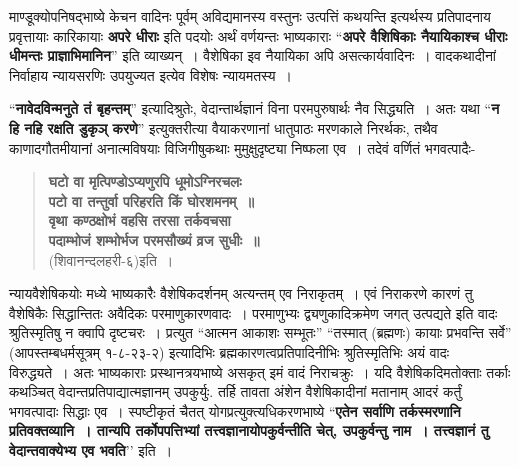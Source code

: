 {माण्डूक्योपनिषद्भाष्ये केचन वादिनः पूर्वम् अविद्यमानस्य वस्तुनः उत्पत्तिं कथयन्ति इत्यर्थस्य प्रतिपादनाय प्रवृत्तायाः कारिकायाः \textbf{अपरे धीराः} इति पदयोः अर्थं वर्णयन्तः भाष्यकाराः “\textbf{अपरे वैशिषिकाः नैयायिकाश्च धीराः धीमन्तः प्राज्ञाभिमानिन}” इति व्याख्यन्~। वैशेषिका इव नैयायिका अपि असत्कार्यवादिनः~। वादकथादीनां निर्वाहाय न्यायसरणिः उपयुज्यत इत्येव विशेषः न्यायमतस्य~। 

“\textbf{नावेदविन्मनुते तं बृहन्तम्}” इत्यादिश्रुतेः, वेदान्तार्थज्ञानं विना परमपुरुषार्थः नैव सिद्ध्यति~। अतः यथा “\textbf{न हि नहि रक्षति डुकृञ् करणे}” इत्युक्तरीत्या वैयाकरणानां धातुपाठः मरणकाले निरर्थकः, तथैव काणादगौतमीयानां अनात्मविषयाः विजिगीषुकथाः मुमुक्षुदृष्ट्या निष्फला एव~। तदेवं वर्णितं भगवत्पादैः-
\begin{verse}
\textbf{घटो वा मृत्पिण्डोऽप्यणुरपि धूमोऽग्निरचलः\\
पटो वा तन्तुर्वा परिहरति किं घोरशमनम्~॥\\
वृथा कण्ठक्षोभं वहसि तरसा तर्कवचसा\\
पदाम्भोजं शम्भोर्भज परमसौख्यं व्रज सुधीः~॥}\\
\hspace{5cm}(शिवानन्दलहरी-६)इति~। 
\end{verse}
न्यायवैशेषिकयोः मध्ये भाष्यकारैः वैशेषिकदर्शनम् अत्यन्तम् एव निराकृतम्~। एवं निराकरणे कारणं तु वैशेषिकैः सिद्धान्तितः अवैदिकः परमाणुकारणवादः~। परमाणुभ्यः द्व्यणुकादिक्रमेण जगत् उत्पद्यते इति वादः श्रुतिस्मृतिषु न क्वापि दृष्टचरः~। प्रत्युत “आत्मन आकाशः सम्भूतः” “तस्मात् (ब्रह्मणः) कायाः प्रभवन्ति सर्वे” (आपस्तम्बधर्मसूत्रम् १-८-२३-२) इत्यादिभिः ब्रह्मकारणत्वप्रतिपादिनीभिः श्रुतिस्मृतिभिः अयं वादः विरुद्ध्यते~। अतः भाष्यकाराः प्रस्थानत्रयभाष्ये असकृत् इमं वादं निराचक्रुः~। यदि वैशेषिकदिमतोक्ताः तर्काः कथञ्चित् वेदान्तप्रतिपाद्यात्मज्ञानम् उपकुर्युः. तर्हि तावता अंशेन वैशेषिकादीनां मतानाम् आदरं कर्तुं भगवत्पादाः सिद्धाः एव~। स्पष्टीकृतं चैतत् योगप्रत्युक्त्यधिकरणभाष्ये “\textbf{एतेन सर्वाणि तर्कस्मरणानि प्रतिवक्तव्यानि~। तान्यपि तर्कोपपत्तिभ्यां तत्त्वज्ञानायोपकुर्वन्तीति चेत्, उपकुर्वन्तु नाम~। तत्त्वज्ञानं तु वेदान्तवाक्येभ्य एव भवति}’’ इति~। 

\articleend
}
